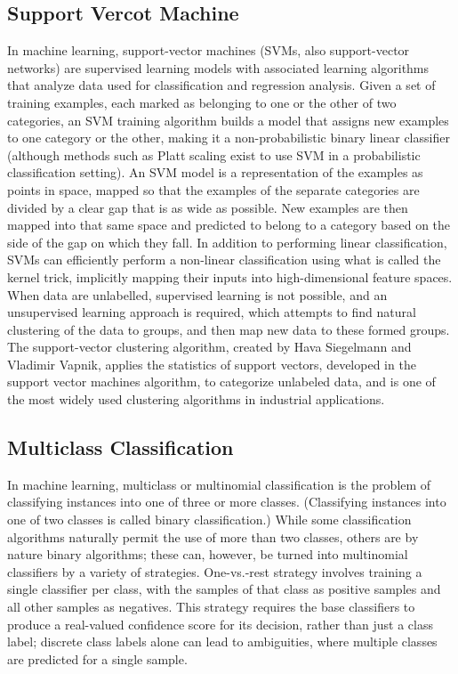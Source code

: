 \documentclass{article}
\begin{document}
{\subsection{Support Vercot Machine}
\par{In machine learning, support-vector machines (SVMs, also support-vector networks) are supervised learning models with associated learning algorithms that analyze data used for classification and regression analysis. Given a set of training examples, each marked as belonging to one or the other of two categories, an SVM training algorithm builds a model that assigns new examples to one category or the other, making it a non-probabilistic binary linear classifier (although methods such as Platt scaling exist to use SVM in a probabilistic classification setting). An SVM model is a representation of the examples as points in space, mapped so that the examples of the separate categories are divided by a clear gap that is as wide as possible. New examples are then mapped into that same space and predicted to belong to a category based on the side of the gap on which they fall. In addition to performing linear classification, SVMs can efficiently perform a non-linear classification using what is called the kernel trick, implicitly mapping their inputs into high-dimensional feature spaces.
When data are unlabelled, supervised learning is not possible, and an unsupervised learning approach is required, which attempts to find natural clustering of the data to groups, and then map new data to these formed groups. The support-vector clustering algorithm, created by Hava Siegelmann and Vladimir Vapnik, applies the statistics of support vectors, developed in the support vector machines algorithm, to categorize unlabeled data, and is one of the most widely used clustering algorithms in industrial applications.}
\subsection{Multiclass Classification}
\par{In machine learning, multiclass or multinomial classification is the problem of classifying instances into one of three or more classes. (Classifying instances into one of two classes is called binary classification.) While some classification algorithms naturally permit the use of more than two classes, others are by nature binary algorithms; these can, however, be turned into multinomial classifiers by a variety of strategies. One-vs.-rest strategy involves training a single classifier per class, with the samples of that class as positive samples and all other samples as negatives. This strategy requires the base classifiers to produce a real-valued confidence score for its decision, rather than just a class label; discrete class labels alone can lead to ambiguities, where multiple classes are predicted for a single sample.}
}
\end{document}
